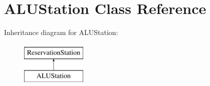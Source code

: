 \hypertarget{classALUStation}{\section{\-A\-L\-U\-Station \-Class \-Reference}
\label{classALUStation}
}
\-Inheritance diagram for \-A\-L\-U\-Station\-:\begin{figure}[H]
\begin{center}
\leavevmode
\includegraphics[height=2.000000cm]{classALUStation}
\end{center}
\end{figure}
